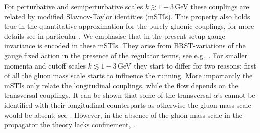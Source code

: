 \documentclass[%
reprint,
superscriptaddress,
showpacs,preprintnumbers,
 amsmath,amssymb,
 aps,
prd,
]{revtex4-1}
\begin{document}
For perturbative and semiperturbative scales $k\gtrsim 1- 3\,$GeV
these couplings are related by modified Slavnov-Taylor identities
(mSTIs). This property also holds true in the quantitative
approximation
\cite{Mitter:2014wpa,Cyrol:2016tym,Cyrol:2017ewj,Cyrol:2017qkl} for
the purely gluonic couplings, for more details see in particular 
\cite{Cyrol:2017ewj}. We emphasise that in the present setup gauge
invariance is encoded in these mSTIs. They arise from BRST-variations
of the gauge fixed action in the presence of the regulator terms, see
e.g.\ \cite{Ellwanger:1994iz,Bonini:1994kp,DAttanasio:1996tzp,%
  Becchi:1996an,Reuter:1997gx,Freire:2000bq,%
  Igarashi:2001mf,Pawlowski:2003sk,Pawlowski:2005xe,%
  Wetterich:2017aoy,Igarashi:2019gkm}. For smaller momenta and cutoff
scales $k\lesssim 1-3\,$GeV they start to differ for two reasons:
first of all the gluon mass scale starts to influence the
running. More importantly the mSTIs only relate the longitudinal
couplings, while the flow depends on the transversal couplings. It can
be shown that some of the transversal $\alpha$'s cannot be identified
with their longitudinal counterparts as otherwise the gluon mass scale
would be absent, see
\cite{Cyrol:2016tym,PhysRevD.26.1453,Aguilar:2011ux,%
  Aguilar:2011xe,Aguilar:2019jsj}.  However, in the absence of the
gluon mass scale in the propagator the theory lacks confinement,
\cite{Braun:2007bx,Braun:2010cy,Fister:2013bh}.
\end{document}
